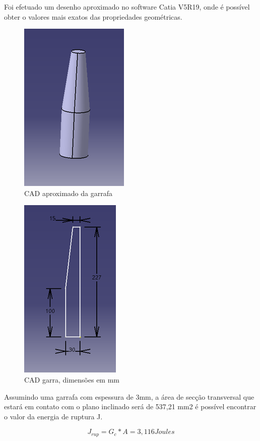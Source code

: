 Foi efetuado um desenho aproximado no software Catia V5R19, onde é possível obter o valores mais exatos das propriedades geométricas.

\begin{figure}[!h]
	\centering
		\includegraphics[scale=0.7]{figuras/estrutura/26.png}
	\caption{CAD aproximado da garrafa}
\end{figure}

\begin{figure}[!h]
	\centering
		\includegraphics[scale=0.7]{figuras/estrutura/27.png}
	\caption{CAD garra, dimensões em mm}
\end{figure}

Assumindo uma garrafa com espessura de 3mm, a área de secção transversal que estará em contato com o plano inclinado será de 537,21 mm2 é possível encontrar o valor da energia de ruptura J.

\begin{equation}
    J_{rup} = G_{c} \ast A = 3,116 Joules
\end{equation}

